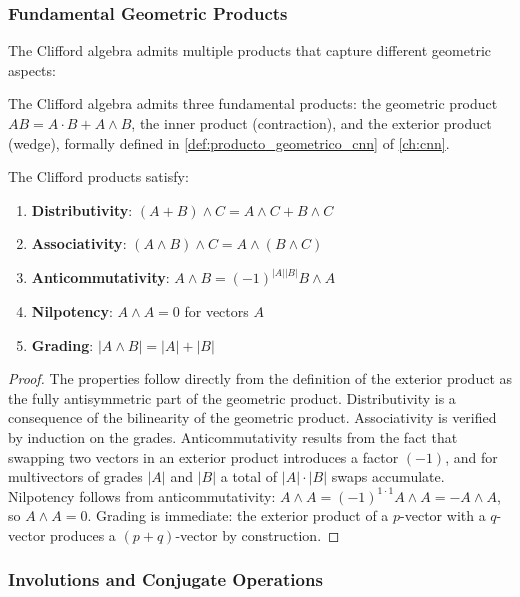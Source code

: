 \subsubsection{Fundamental Geometric Products}

The Clifford algebra admits multiple products that capture different geometric aspects:

The Clifford algebra admits three fundamental products: the geometric product $AB = A \cdot B + A \wedge B$, the inner product (contraction), and the exterior product (wedge), formally defined in \autoref{def:producto_geometrico_cnn} of \autoref{ch:cnn}.\label{def:productos_clifford}

\begin{proposition}\label{prop:propiedades_productos_clifford}
The Clifford products satisfy:
\begin{enumerate}
    \item \textbf{Distributivity}: $(A + B) \wedge C = A \wedge C + B \wedge C$
    \item \textbf{Associativity}: $(A \wedge B) \wedge C = A \wedge (B \wedge C)$
    \item \textbf{Anticommutativity}: $A \wedge B = (-1)^{|A||B|} B \wedge A$
    \item \textbf{Nilpotency}: $A \wedge A = 0$ for vectors $A$
    \item \textbf{Grading}: $|A \wedge B| = |A| + |B|$
\end{enumerate}
\end{proposition}

\begin{proof}
The properties follow directly from the definition of the exterior product as the fully antisymmetric part of the geometric product. Distributivity is a consequence of the bilinearity of the geometric product. Associativity is verified by induction on the grades. Anticommutativity results from the fact that swapping two vectors in an exterior product introduces a factor $(-1)$, and for multivectors of grades $|A|$ and $|B|$ a total of $|A| \cdot |B|$ swaps accumulate. Nilpotency follows from anticommutativity: $A \wedge A = (-1)^{1 \cdot 1} A \wedge A = -A \wedge A$, so $A \wedge A = 0$. Grading is immediate: the exterior product of a $p$-vector with a $q$-vector produces a $(p+q)$-vector by construction.
\end{proof}

\subsubsection{Involutions and Conjugate Operations}


